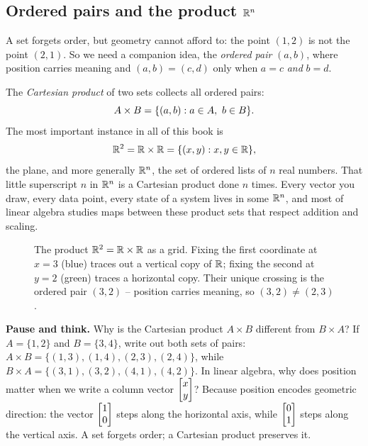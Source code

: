 \subsection{Ordered pairs and the product $\mathbb{R}^n$}

A set forgets order, but geometry cannot afford to: the point $(1,2)$ is not the point
$(2,1)$. So we need a companion idea, the \emph{ordered pair} $(a,b)$, where position
carries meaning and $(a,b) = (c,d)$ only when $a=c$ \emph{and} $b=d$.

The \emph{Cartesian product} of two sets collects all ordered pairs:
\[
  A \times B = \set{(a,b) : a \in A,\ b \in B}.
\]
The most important instance in all of this book is
\[
  \mathbb{R}^2 = \mathbb{R} \times \mathbb{R} = \{(x,y) : x,y \in \mathbb{R}\},
\]
the plane, and more generally $\mathbb{R}^n$, the set of ordered lists of $n$ real numbers. That
little superscript $n$ in $\mathbb{R}^n$ is a Cartesian product done $n$ times. Every vector you
draw, every data point, every state of a system lives in some $\mathbb{R}^n$, and most of linear
algebra studies maps between these product sets that respect addition and scaling.

\begin{figure}[H]
\centering
{}
\caption{The product $\mathbb{R}^2 = \mathbb{R} \times \mathbb{R}$ as a grid. Fixing the first coordinate at
$x=3$ (blue) traces out a vertical copy of $\mathbb{R}$; fixing the second at $y=2$ (green) traces
a horizontal copy. Their unique crossing is the ordered pair $(3,2)$ -- position carries
meaning, so $(3,2) \ne (2,3)$.}
\label{ch38:product}
\end{figure}

\begin{recoverybox}
\textbf{Pause and think.} Why is the Cartesian product $A \times B$ different from $B \times A$?
If $A = \{1, 2\}$ and $B = \{3, 4\}$, write out both sets of pairs: $A \times B = \{(1,3),(1,4),(2,3),(2,4)\}$,
while $B \times A = \{(3,1),(3,2),(4,1),(4,2)\}$.
In linear algebra, why does position matter when we write a column vector $\begin{bmatrix}x\\y\end{bmatrix}$?
Because position encodes geometric direction: the vector $\begin{bmatrix}1\\0\end{bmatrix}$ steps along the horizontal axis,
while $\begin{bmatrix}0\\1\end{bmatrix}$ steps along the vertical axis. A set forgets order; a Cartesian product preserves it.
\end{recoverybox}

